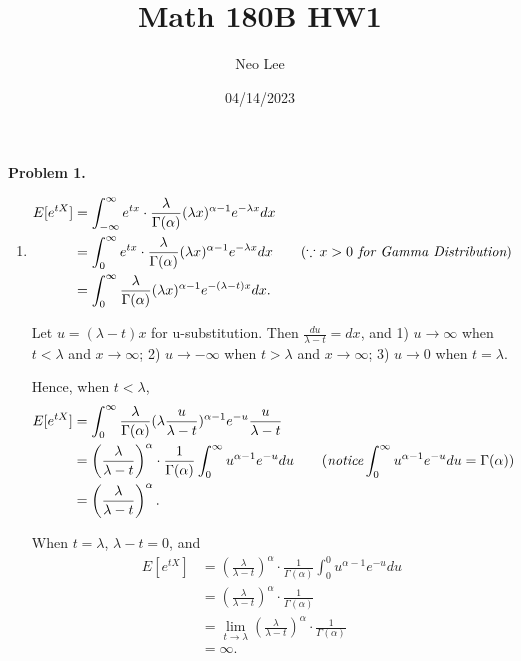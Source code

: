 \documentclass{article}
\title{Math 180B HW1}
\author{Neo Lee}
\date{04/14/2023}
\begin{document}
 

\maketitle 

\textbf{Problem 1.} 
\begin{enumerate}[label=(\alph*)]
    \item 
    \begin{align}
        E[e^{tX}] & = \int_{-\infty}^{\infty}e^{tx} \cdot \frac{\lambda}{\Gamma (\alpha)}(\lambda x)^{\alpha-1}e^{-\lambda x}dx \nonumber \\
        & = \int_{0}^{\infty}e^{tx} \cdot \frac{\lambda}{\Gamma (\alpha)}(\lambda x)^{\alpha-1}e^{-\lambda x}dx \qquad (\because x > 0 \emph{ for Gamma Distribution}) \nonumber \\
        & = \int_{0}^{\infty}\frac{\lambda}{\Gamma (\alpha)}(\lambda x)^{\alpha-1}e^{-(\lambda - t)x}dx. \nonumber 
    \end{align}

    Let $u = (\lambda - t)x$ for u-substitution. 
    Then $\frac{du}{\lambda - t} = dx$, and 1) $u\rightarrow \infty$ when $t < \lambda$ and $x\rightarrow\infty$;
    2) $u\rightarrow -\infty$ when $t > \lambda$ and $x\rightarrow\infty$; 
    3) $u\rightarrow 0$ when $t = \lambda$.

    Hence, when $t < \lambda$,
    \begin{align}
        E[e^{tX}] & = \int_{0}^{\infty}\frac{\lambda}{\Gamma (\alpha)}(\lambda \frac{u}{\lambda-t})^{\alpha-1}e^{-u}\frac{u}{\lambda-t} \nonumber \\
        & = \left(\frac{\lambda}{\lambda-t}\right)^\alpha \cdot \frac{1}{\Gamma (\alpha)}\int_{0}^{\infty}u^{\alpha-1}e^{-u}du \nonumber \qquad (\emph{notice} \int_{0}^{\infty}u^{\alpha-1}e^{-u}du = \Gamma (\alpha)) \\
        & = \left(\frac{\lambda}{\lambda-t}\right)^\alpha. \nonumber
    \end{align}

    When $t = \lambda$, $\lambda - t =0$, and 
    \begin{align}
        E[e^{tX}] & = \left(\frac{\lambda}{\lambda-t}\right)^\alpha \cdot \frac{1}{\Gamma (\alpha)}\int_{0}^{0}u^{\alpha-1}e^{-u}du \nonumber \\
        & = \left(\frac{\lambda}{\lambda-t}\right)^\alpha \cdot \frac{1}{\Gamma (\alpha)} \nonumber \\
        & = \lim_{t \rightarrow \lambda} \left(\frac{\lambda}{\lambda-t}\right)^\alpha \cdot \frac{1}{\Gamma (\alpha)} \nonumber \\
        & = \infty. \nonumber
    \end{align}


\end{enumerate}
\end{document}
